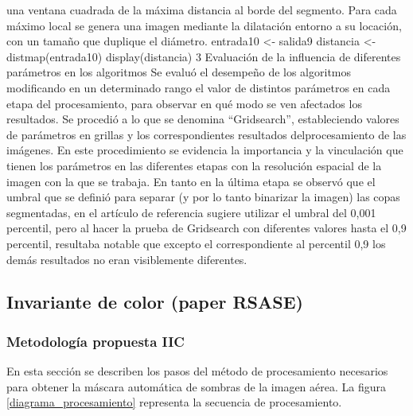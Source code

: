 una ventana cuadrada de la máxima distancia al borde del segmento. Para cada máximo
local se genera una imagen mediante la dilatación entorno a su locación, con un tamaño
que duplique el diámetro.
entrada10 <- salida9
distancia <- distmap(entrada10)
display(distancia)
3 Evaluación de la influencia de diferentes parámetros en los 
algoritmos
Se evaluó el desempeño de los algoritmos modificando en un determinado rango el
valor de distintos parámetros en cada etapa del procesamiento, para observar en qué
modo se ven afectados los resultados. Se procedió a lo que se denomina “Gridsearch”,
estableciendo valores de parámetros en grillas y los correspondientes resultados delprocesamiento de las imágenes. En este procedimiento se evidencia la importancia y la
vinculación que tienen los parámetros en las diferentes etapas con la resolución espacial
de la imagen con la que se trabaja. En tanto en la última etapa se observó que el umbral
que se definió para separar (y por lo tanto binarizar la imagen) las copas segmentadas,
en el artículo de referencia sugiere utilizar el umbral del 0,001 percentil, pero al hacer la
prueba de Gridsearch con diferentes valores hasta el 0,9 percentil, resultaba notable que
excepto el correspondiente al percentil 0,9 los demás resultados no eran visiblemente
diferentes.



\subsection{Invariante de color (paper RSASE)}
\subsubsection{Metodología propuesta IIC}
En esta sección se describen los pasos del método de procesamiento necesarios para obtener la máscara automática de sombras de la imagen aérea. La figura \ref{diagrama_procesamiento} representa la secuencia de procesamiento.

